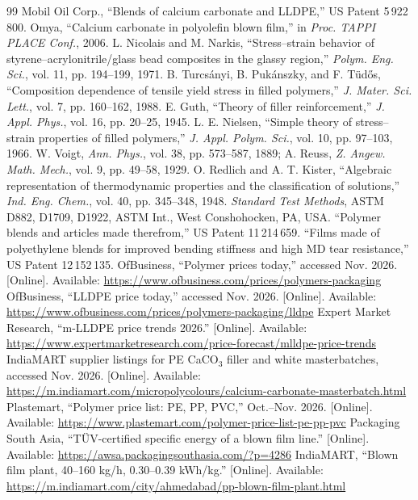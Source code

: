 \documentclass[conference,a4paper]{IEEEtran}
\begin{document}
\begin{thebibliography}{99}
 Mobil Oil Corp., ``Blends of calcium carbonate and LLDPE,'' US Patent 5\,922\,800.
 Omya, ``Calcium carbonate in polyolefin blown film,'' in \emph{Proc. TAPPI PLACE Conf.}, 2006.
 L. Nicolais and M. Narkis, ``Stress--strain behavior of styrene--acrylonitrile/glass bead composites in the glassy region,'' \emph{Polym. Eng. Sci.}, vol. 11, pp. 194--199, 1971.
 B. Turcs\'anyi, B. Puk\'anszky, and F. T\"ud\H{o}s, ``Composition dependence of tensile yield stress in filled polymers,'' \emph{J. Mater. Sci. Lett.}, vol. 7, pp. 160--162, 1988.
 E. Guth, ``Theory of filler reinforcement,'' \emph{J. Appl. Phys.}, vol. 16, pp. 20--25, 1945.
 L. E. Nielsen, ``Simple theory of stress--strain properties of filled polymers,'' \emph{J. Appl. Polym. Sci.}, vol. 10, pp. 97--103, 1966.
 W. Voigt, \emph{Ann. Phys.}, vol. 38, pp. 573--587, 1889; A. Reuss, \emph{Z. Angew. Math. Mech.}, vol. 9, pp. 49--58, 1929.
 O. Redlich and A. T. Kister, ``Algebraic representation of thermodynamic properties and the classification of solutions,'' \emph{Ind. Eng. Chem.}, vol. 40, pp. 345--348, 1948.
 \emph{Standard Test Methods}, ASTM D882, D1709, D1922, ASTM Int., West Conshohocken, PA, USA.
 ``Polymer blends and articles made therefrom,'' US Patent 11\,214\,659.
 ``Films made of polyethylene blends for improved bending stiffness and high MD tear resistance,'' US Patent 12\,152\,135.
 OfBusiness, ``Polymer prices today,'' accessed Nov. 2026. [Online]. Available: \url{https://www.ofbusiness.com/prices/polymers-packaging}
 OfBusiness, ``LLDPE price today,'' accessed Nov. 2026. [Online]. Available: \url{https://www.ofbusiness.com/prices/polymers-packaging/lldpe}
 Expert Market Research, ``m-LLDPE price trends 2026.'' [Online]. Available: \url{https://www.expertmarketresearch.com/price-forecast/mlldpe-price-trends}
 IndiaMART supplier listings for PE CaCO$_3$ filler and white masterbatches, accessed Nov. 2026. [Online]. Available: \url{https://m.indiamart.com/micropolycolours/calcium-carbonate-masterbatch.html}
 Plastemart, ``Polymer price list: PE, PP, PVC,'' Oct.--Nov. 2026. [Online]. Available: \url{https://www.plastemart.com/polymer-price-list-pe-pp-pvc}
 Packaging South Asia, ``TÜV-certified specific energy of a blown film line.'' [Online]. Available: \url{https://awsa.packagingsouthasia.com/?p=4286}
 IndiaMART, ``Blown film plant, 40--160 kg/h, 0.30--0.39 kWh/kg.'' [Online]. Available: \url{https://m.indiamart.com/city/ahmedabad/pp-blown-film-plant.html}
\end{thebibliography}
\end{document}
